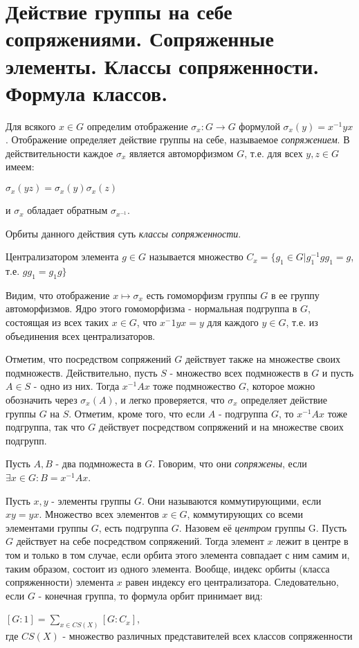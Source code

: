 \section{Действие группы на себе сопряжениями. Сопряженные элементы. Классы сопряженности. Формула классов.}

Для всякого $x \in G$ определим отображение $\sigma_x: G \rightarrow G$ формулой $\sigma_x(y) = x^{-1}yx$. Отображение
определяет действие группы на себе, называемое \emph{сопряжением}. В действительности каждое $\sigma_x$ является
автоморфизмом $G$, т.е. для всех $y, z \in G$ имеем:
\begin{center} $\sigma_x(yz) = \sigma_x(y)\sigma_x(z)$\\ \end{center}
и $\sigma_x$ обладает обратным $\sigma_{x^{-1}}$.

Орбиты данного действия суть \emph{классы сопряженности}.

\begin{defn}
Централизатором элемента $g \in G$ называется множество $C_x = \{g_1 \in G | g^{-1}_1gg_1 = g$, т.е. $gg_1 = g_1g\}$
\end{defn}


Видим, что отображение $x \mapsto \sigma_x$ есть гомоморфизм группы $G$ в ее группу автоморфизмов. Ядро этого гомоморфизма
- нормальная подгруппа в $G$, состоящая из всех таких $x \in G$, что $x^-1yx = y$ для каждого $y \in G$, т.е. из
объединения всех централизаторов. 

Отметим, что посредством сопряжений $G$ действует также на множестве своих подмножеств. Действительно, пусть $S$ - множество
всех подмножеств в $G$ и пусть $A \in S$ - одно из них. Тогда $x^{-1}Ax$ тоже подмножество $G$, которое можно обозначить
через $\sigma_x(A)$, и легко проверяется, что $\sigma_x$ определяет действие группы $G$ на $S$. Отметим, кроме того, что
если $A$ - подгруппа $G$, то $x^{-1}Ax$ тоже подгруппа, так что $G$ действует посредством сопряжений и на множестве своих
подгрупп.

\begin{defn}
Пусть $A, B$ - два подмножеста в $G$. Говорим, что они \emph{сопряжены}, если $\exists x \in G: B = x^{-1}Ax$.
\end{defn}

Пусть $x, y$ - элементы группы $G$. Они называются коммутирующими, если $xy = yx$. Множество всех элементов $x \in G$,
коммутирующих со всеми элементами группы $G$, есть подгруппа $G$. Назовем её \emph{центром} группы G. Пусть $G$ действует
на себе посредством сопряжений. Тогда элемент $x$ лежит в центре в том и только в том случае, если орбита этого элемента
совпадает с ним самим и, таким образом, состоит из одного элемента. Вообще, индекс орбиты (класса сопряженности) элемента
$x$ равен индексу его централизатора. Следовательно, если $G$ - конечная группа, то формула орбит принимает вид:
\begin{center} $[G:1] = {\underset{x \in CS(X)}{\sum}}[G : C_x]$,\\
где $CS(X)$ - множество различных представителей всех классов сопряженности \end{center}
